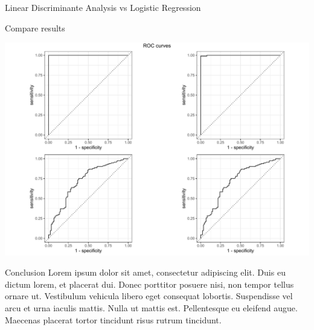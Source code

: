 \documentclass[
  ignorenonframetext,
]{article}
\begin{document}
\begin{frame}[fragile]{Linear Discriminante Analysis vs Logistic Regression}
\begin{block}{Compare results}
\begin{center}\includegraphics{_main_files/figure-beamer/unnamed-chunk-49-1} \end{center}
\end{block}

\begin{block}{Conclusion}
\protect\hypertarget{conclusion-2}{}
Lorem ipsum dolor sit amet, consectetur adipiscing elit. Duis eu dictum lorem, et placerat dui. Donec porttitor posuere nisi, non tempor tellus ornare ut. Vestibulum vehicula libero eget consequat lobortis. Suspendisse vel arcu et urna iaculis mattis. Nulla ut mattis est. Pellentesque eu eleifend augue. Maecenas placerat tortor tincidunt risus rutrum tincidunt.
\end{block}
\end{frame}
\end{document}
